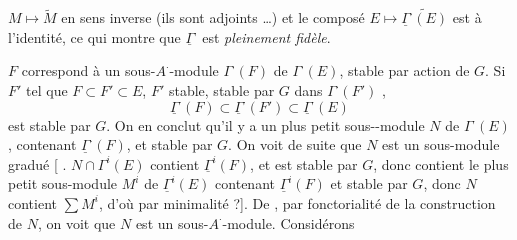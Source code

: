 \documentclass[11pt,a4paper]{article}
\begin{document}
$M \mapsto \widetilde{M}$ en sens inverse (ils sont adjoints \ldots) et le
composé  $E \mapsto \widetilde{\underline{\Gamma}^{\cdot}(E)}$ est
 à l'identité, ce qui montre que $\underline{\Gamma}^{\cdot}$
est \emph{pleinement fidèle}.

$F$ correspond à un sous-\struck{\ill{}}$A^{\cdot}$-module $\Gamma^{\cdot}(F)$
de $\Gamma^{\cdot}(E)$, \ill{}  stable par action de $G$.
Si  $F'$ tel que $F \subset F' \subset E$,
$F'$ stable, \ill{} stable par $G$ dans $\Gamma^{\cdot}(F')$
, 
\[
  \underline{\Gamma}^{\cdot}(F) \subset \underline{\Gamma}^{\cdot}(F')
  \subset \underline{\Gamma}^{\cdot}(E)
\]
est \ill{} stable par $G$. On en conclut qu'il y a un plus petit
sous-\ill{}-module $N$ de $\Gamma^{\cdot}(E)$, contenant
$\underline{\Gamma}^{\cdot}(F)$, et stable par $G$.
On voit de suite que $N$ est un sous-module gradué
[\ill{} \ill{}. $N \cap \Gamma^{i}(E)$ contient $\underline{\Gamma}^{i}(F)$,
et est stable par $G$, donc contient le plus petit sous-module $M^{i}$ de
$\underline{\Gamma}^{i}(E)$ contenant $\underline{\Gamma}^{i}(F)$ et stable par
$G$, donc $N$ contient $\sum M^{i}$, d'où par minimalité
 ?]. De \ill{}, par fonctorialité de la construction de
$N$, on voit que $N$ est un sous-$A^{\cdot}$-module. Considérons
\end{document}
